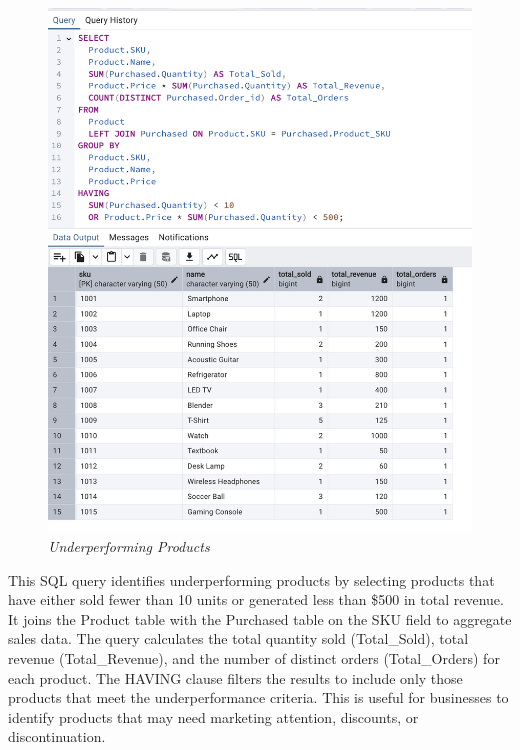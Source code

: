 


\begin{figure}[H]
  \centering
  \includegraphics[width=1\textwidth]{images/sql/complex-queries/underperforming_products.png}
  \caption{\textit{Underperforming Products}}
\end{figure}

This SQL query identifies underperforming products by selecting products that have either sold fewer than 10 units or generated less than \$500 in total revenue. It joins the Product table with the Purchased table on the SKU field to aggregate sales data. The query calculates the total quantity sold (Total\_Sold), total revenue (Total\_Revenue), and the number of distinct orders (Total\_Orders) for each product. The HAVING clause filters the results to include only those products that meet the underperformance criteria. This is useful for businesses to identify products that may need marketing attention, discounts, or discontinuation.

